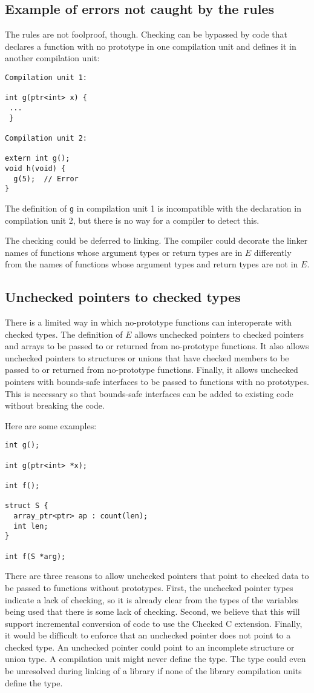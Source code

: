 \subsection{Example of errors not caught by the rules}
The rules are not foolproof, though. Checking can be bypassed by code that
declares a function with no prototype in one
compilation unit and defines it in another compilation unit:
\begin{lstlisting}
Compilation unit 1:

int g(ptr<int> x) {
 ...
 }

Compilation unit 2:

extern int g();
void h(void) {
  g(5);  // Error
}
\end{lstlisting}
The definition of \lstinline+g+ in compilation unit 1 is incompatible with
the declaration in compilation unit 2, but there is no way for a compiler
to detect this.

The checking could be deferred to linking. The compiler could decorate the linker names of
functions whose argument types or return types are in $E$ differently from the names 
of functions whose argument types and return types are not in $E$.

\subsection{Unchecked pointers to checked types}
There is a limited way in which no-prototype functions can interoperate with checked types.
The definition of $E$ allows unchecked
pointers to checked pointers and arrays
to be passed to or returned from no-prototype functions.  It also allows unchecked pointers to
structures or unions that have checked members to be passed to or returned from
no-prototype functions.  Finally, it allows unchecked pointers with bounds-safe interfaces to be
passed to functions with no prototypes.  This is necessary so that bounds-safe interfaces
can be added to existing code without breaking the code.   

Here are some examples:
\begin{lstlisting}
int g();

int g(ptr<int> *x);

int f();

struct S {
  array_ptr<ptr> ap : count(len);
  int len;
}

int f(S *arg);
\end{lstlisting}

There are three reasons to allow unchecked pointers that point to checked data to
be passed to functions without prototypes.  First, the unchecked pointer types 
indicate a lack of checking, so it is already clear from the types of the variables being
used that there is some lack of checking.  Second, we believe that this
will support incremental conversion of code to use the Checked C extension.  Finally,
it would be difficult to enforce that an unchecked pointer does not point
to a checked type. An unchecked pointer could point to an incomplete
structure or union type. A compilation unit might never define the type. The type
could even be unresolved during linking of a library if none of the library compilation units
define the type.
